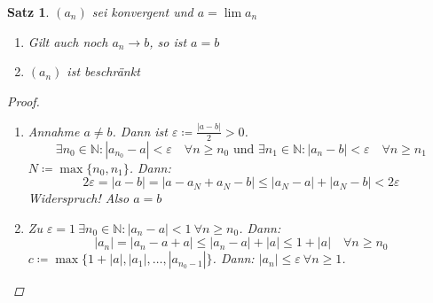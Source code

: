 \documentclass[14pt,titlepage,ngerman,a4paper,headsepline,DIV15,halfparskip*]{scrartcl}
\newcommand{\N}{\mathbb{N}}
\theoremstyle{named}
\theoremstyle{dotless}
\newtheorem{satz}[namedtheorem]{Satz}
\begin{document}
\begin{satz} \label{2.1:satz}
	$(a_{n})$ sei konvergent und $a = \lim a_{n}$
	\begin{enumerate}
		\item Gilt auch noch $a_{n} \rightarrow b$, so ist $a = b$
		\item $(a_{n})$ ist beschränkt \label{2.1.b:satz}
	\end{enumerate}
	
	\begin{proof}\
	  \begin{enumerate}
		\item Annahme $a \neq b$. Dann ist $\varepsilon \coloneqq \frac{|a - b|}{2} > 0$.
			$$
			\exists n_{0} \in \N: |a_{n_{0}} - a| < \varepsilon \quad \forall n \geq n_{0} \text{ und } \exists n_{1} \in \N: |a_n - b| < \varepsilon \quad \forall n \geq n_{1}
			$$
			$N \coloneqq \max \{ n_{0}, n_{1} \}$. Dann:
			$$
				2 \varepsilon = |a - b| = | a - a_{N} + a_{N} - b| \leq |a_{N} - a| + |a_{N} - b| < 2 \varepsilon
			$$
			Widerspruch! Also $ a = b$
		\item  Zu $\varepsilon = 1 ~\exists n_{0} \in \N: |a_{n} - a| < 1 ~\forall n \geq n_{0}$. Dann:
			$$
				|a_{n}| = |a_{n} - a + a| \leq |a_{n} - a| + |a| \leq 1 + |a| \quad \forall n \geq n_{0}
			$$
			$c \coloneqq \max \{ 1 + |a|, |a_{1}|, \dotsc, |a_{n_{0} - 1}| \}$. Dann: $|a_{n}| \leq \varepsilon ~\forall n \geq 1$.
	  \end{enumerate}
	\end{proof}	
\end{satz}
\end{document}
